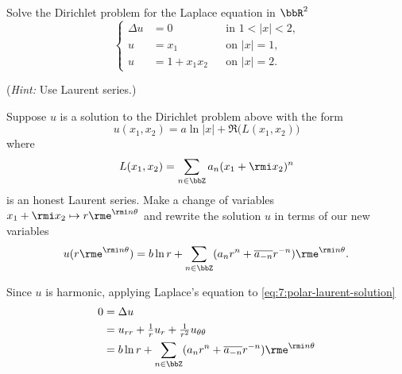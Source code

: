 \begin{problem}
  Solve the Dirichlet problem for the Laplace equation in \(\bbR^2\)
  \[
    \left\{
      \begin{aligned}
        \Delta u&=0&&\text{in \(1<|x|<2\),}\\
        u&=x_1&&\text{on \(|x|=1\),}\\
        u&=1+x_1x_2&&\text{on \(|x|=2\).}
      \end{aligned}
    \right.
  \]

  \noindent (\emph{Hint:} Use Laurent series.)
\end{problem}
\begin{solution}
  Suppose \(u\) is a solution to the Dirichlet problem above with the form
  \[
    u(x_1,x_2)=a\ln|x|+\Re\bigl(L(x_1,x_2)\bigr)
  \]
  where
  \[
    L(x_1,x_2)=\sum_{n\in\bbZ} a_n(x_1+\rmi x_2)^n
  \]
  is an honest Laurent series. Make a change of variables
  \(x_1+\rmi x_2\mapsto r\rme^{\rmi n\theta}\) and rewrite the solution \(u\)
  in terms of our new variables
  \begin{equation}
    \label{eq:7:polar-laurent-solution}
    u(r\rme^{\rmi n\theta})
    =b\ln r+\sum_{n\in\bbZ} (a_n r^n+\overline{a_{-n}}r^{-n})\rme^{\rmi n\theta}.
  \end{equation}


  Since \(u\) is harmonic, applying Laplace's equation to
  \eqref{eq:7:polar-laurent-solution}
  \begin{align*}
    0&=\Delta u\\
     &=u_{rr}+\tfrac{1}{r}u_r+\tfrac{1}{r^2}u_{\theta\theta}\\
     &=b\ln r+\sum_{n\in\bbZ} (a_n r^n+\overline{a_{-n}}r^{-n})\rme^{\rmi n\theta}
  \end{align*}
\end{solution}
\newpage

